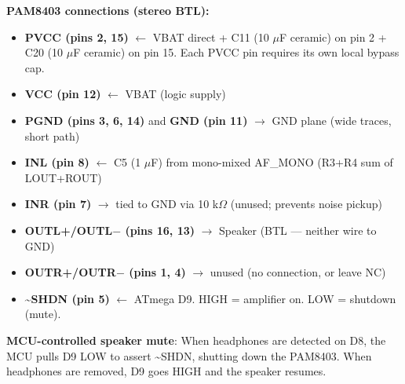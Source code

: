 \documentclass[a4paper,11pt]{article}
\renewcommand*{\,}{ }%
\begin{document}
\begin{diagrambox}
\end{diagrambox}

\begin{infobox}
\textbf{PAM8403 connections (stereo BTL):}
\begin{itemize}[noitemsep]
  \item \textbf{PVCC (pins 2, 15)} $\leftarrow$ VBAT direct + C11 (10\,$\mu$F ceramic) on pin 2 + C20 (10\,$\mu$F ceramic) on pin 15. Each PVCC pin requires its own local bypass cap.
  \item \textbf{VCC (pin 12)} $\leftarrow$ VBAT (logic supply)
  \item \textbf{PGND (pins 3, 6, 14)} and \textbf{GND (pin 11)} $\rightarrow$ GND plane (wide traces, short path)
  \item \textbf{INL (pin 8)} $\leftarrow$ C5 (1\,$\mu$F) from mono-mixed AF\_MONO (R3+R4 sum of LOUT+ROUT)
  \item \textbf{INR (pin 7)} $\rightarrow$ tied to GND via 10\,k$\Omega$ (unused; prevents noise pickup)
  \item \textbf{OUTL+/OUTL$-$ (pins 16, 13)} $\rightarrow$ Speaker (BTL --- neither wire to GND)
  \item \textbf{OUTR+/OUTR$-$ (pins 1, 4)} $\rightarrow$ unused (no connection, or leave NC)
  \item \textbf{\textasciitilde{}SHDN (pin 5)} $\leftarrow$ ATmega D9. HIGH = amplifier on. LOW = shutdown (mute).
\end{itemize}
\textbf{MCU-controlled speaker mute}: When headphones are detected on D8, the MCU pulls D9 LOW to assert \textasciitilde{}SHDN, shutting down the PAM8403. When headphones are removed, D9 goes HIGH and the speaker resumes.
\end{infobox}
\end{document}
